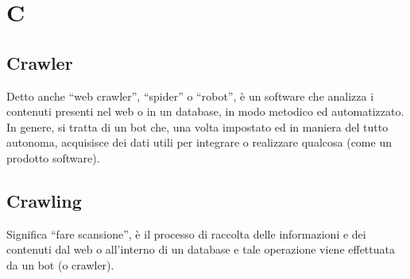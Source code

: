 \section{C}

\subsection{Crawler} Detto anche “web crawler”, “spider” o “robot”, è un software che analizza i contenuti presenti nel web o in un database, in modo metodico ed automatizzato. In genere, si tratta di un bot che, una volta impostato ed in maniera del tutto autonoma, acquisisce dei dati utili per integrare o realizzare qualcosa (come un prodotto software). 

\subsection{Crawling} Significa “fare scansione”, è il processo di raccolta delle informazioni e dei contenuti dal web o all’interno di un database e tale operazione viene effettuata da un bot (o crawler). 

\clearpage